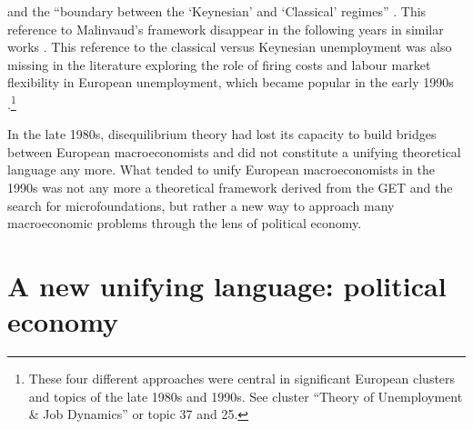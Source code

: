 \documentclass[]{elsarticle} %
\begin{document}
\citet{malinvaud1977} and the ``boundary between the `Keynesian' and
`Classical' regimes'' \citep[408]{lindbeck1987a}. This reference to
Malinvaud's framework disappear in the following years in similar works
\citep[as in][for instance]{gottfries1992}. This reference to the
classical versus Keynesian unemployment was also missing in the
literature exploring the role of firing costs and labour market
flexibility in European unemployment, which became popular in the early
1990s \citep{bertola1990a, bentolila1990, bentolila1992a}.\footnote{These
  four different approaches were central in significant European
  clusters and topics of the late 1980s and 1990s. See cluster ``Theory
  of Unemployment \& Job Dynamics'' or topic 37 and 25.}

In the late 1980s, disequilibrium theory had lost its capacity to build
bridges between European macroeconomists and did not constitute a
unifying theoretical language any more. What tended to unify European
macroeconomists in the 1990s was not any more a theoretical framework
derived from the GET and the search for microfoundations, but rather a
new way to approach many macroeconomic problems through the lens of
political economy.

\hypertarget{political-economics}{%
\section{A new unifying language: political
economy}\label{political-economics}}
\end{document}
